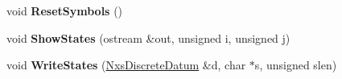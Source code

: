 \begin{DoxyCompactItemize}
\item 
\hypertarget{classNxsCharactersBlock_a60329b2e678a91ca6cd46957093e6f56}{
void {\bfseries ResetSymbols} ()}
\label{classNxsCharactersBlock_a60329b2e678a91ca6cd46957093e6f56}

\item 
\hypertarget{classNxsCharactersBlock_aaeacb0381494d0b1d451135929874743}{
void {\bfseries ShowStates} (ostream \&out, unsigned i, unsigned j)}
\label{classNxsCharactersBlock_aaeacb0381494d0b1d451135929874743}

\item 
\hypertarget{classNxsCharactersBlock_a393ef5490c25965a1418115780afa3f8}{
void {\bfseries WriteStates} (\hyperlink{classNxsDiscreteDatum}{NxsDiscreteDatum} \&d, char $\ast$s, unsigned slen)}
\label{classNxsCharactersBlock_a393ef5490c25965a1418115780afa3f8}

\end{DoxyCompactItemize}

